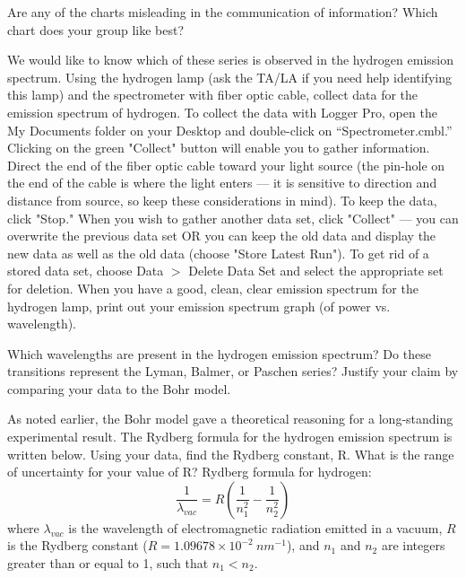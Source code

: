 Are any of the charts misleading in the communication of information? 
Which chart does your group like best?
\par
We would like to know which of these series is observed in the hydrogen emission spectrum.
Using the hydrogen lamp (ask the TA/LA if you need help identifying this lamp) and the spectrometer with fiber optic cable, collect data for the emission spectrum of hydrogen. 
To collect the data with Logger Pro, open the My Documents folder on your Desktop and double-click on “Spectrometer.cmbl.” 
Clicking on the green "Collect" button will enable you to gather information.
Direct the end of the fiber optic cable toward your light source (the pin-hole on the end of the cable is where the light enters — it is sensitive to direction and distance from source, so keep these considerations in mind). 
To keep the data, click "Stop." 
When you wish to gather another data set, click "Collect" — you can overwrite the previous data set OR you can keep the old data and display the new data as well as the old data (choose "Store Latest Run"). 
To get rid of a stored data set, choose Data $>$ Delete Data Set and select the appropriate set for deletion. 
When you have a good, clean, clear emission spectrum for the hydrogen lamp, print out your emission spectrum graph (of power vs. wavelength).
\par 
Which wavelengths are present in the hydrogen emission spectrum? 
Do these transitions represent the Lyman, Balmer, or Paschen series? 
Justify your claim by comparing your data to the Bohr model. 
\par 
As noted earlier, the Bohr model gave a theoretical reasoning for a long-standing experimental result. 
The Rydberg formula for the hydrogen emission spectrum is written below. 
Using your data, find the Rydberg constant, R. 
What is the range of uncertainty for your value of R?
\vfill
\noindent
Rydberg formula for hydrogen:
\[ \frac{1}{\lambda_{vac}} = R \left( \frac{1}{n_{1}^{2}} - \frac{1}{n_{2}^{2}} \right) \]
where $ \lambda_{vac} $ is the wavelength of electromagnetic radiation emitted in a vacuum, $R$ is the Rydberg constant ($R = 1.09678\times 10^{-2} \: nm^{-1}$), and $n_{1}$ and $n_{2}$ are integers greater than or equal to 1, such that $n_{1} < n_{2}$.


